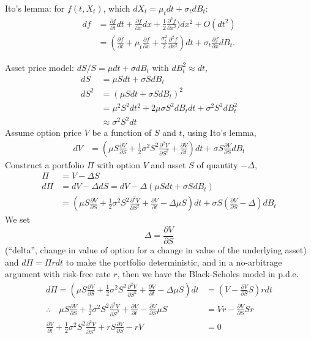 \documentclass[9pt,twocolumn]{extarticle}
\begin{document}
Ito's lemma: for $f(t,X_t)$, which $dX_t = \mu_t dt + \sigma_t dB_t$:
\begin{align*}
df &= \frac{\partial f}{\partial t} dt + \frac{\partial f}{\partial x} dx + \frac{1}{2} \frac{\partial^2 f}{\partial x^2}) dx^2 + O(dt^2) \\
&= \left(\frac{\partial f}{\partial t} + \mu_t \frac{\partial f}{\partial x}+\frac{\sigma_t^2}{2}\frac{\partial^2 f}{\partial x^2}\right) dt + \sigma_t \frac{\partial f}{\partial x}dB_t.
\end{align*}

Asset price model: $dS/S = \mu dt + \sigma dB_t$ with $dB_t^2 \approx dt$,
\begin{align*}
dS &= \mu S dt + \sigma S dB_t \\
dS^2 &= (\mu S dt + \sigma S dB_t)^2 \\
     &= \mu^2 S^2 dt^2 + 2\mu \sigma S^2 dB_t dt + \sigma^2 S^2 dB_t^2 \\
	 &\approx \sigma^2 S^2 dt
\end{align*}
Assume option price $V$ be a function of $S$ and $t$, using Ito's lemma,
\begin{align*}
dV
&= \left(\mu S \frac{\partial V}{\partial S} + \frac{1}{2}\sigma^2 S^2 \frac{\partial^2 V}{\partial S^2} + \frac{\partial V}{\partial t}\right) dt + \sigma S \frac{\partial V}{\partial S} dB_t
\end{align*}
Construct a portfolio $\Pi$ with option $V$ and asset $S$ of quantity $-\Delta$,
\begin{align*}
\Pi &= V - \Delta S \\
d\Pi &= dV - \Delta dS = dV - \Delta(\mu S dt + \sigma S dB_t)\\
&= \left(\mu S \frac{\partial V}{\partial S} + \frac{1}{2}\sigma^2 S^2 \frac{\partial^2 V}{\partial S^2} + \frac{\partial V}{\partial t} - \Delta\mu S\right) dt + \sigma S \left(\frac{\partial V}{\partial S} - \Delta\right) dB_t
\end{align*}
We set $$\Delta = \frac{\partial V}{\partial S}$$ (``delta'', change in value
of option for a change in value of the underlying asset) and $d\Pi = \Pi r dt$
to make the portfolio deterministic, and in a no-arbitrage argument with
risk-free rate $r$, then we have the Black-Scholes model in p.d.e.
\begin{align*}
d\Pi
= \left(\mu S \frac{\partial V}{\partial S} + \frac{1}{2}\sigma^2 S^2 \frac{\partial^2 V}{\partial S^2} + \frac{\partial V}{\partial t} - \Delta\mu S\right) dt
&= \left(V - \frac{\partial V}{\partial S} S\right)rdt \\
\therefore\quad 
\mu S \frac{\partial V}{\partial S} + \frac{1}{2}\sigma^2 S^2 \frac{\partial^2 V}{\partial S^2} + \frac{\partial V}{\partial t} - \frac{\partial V}{\partial S}\mu S
&= Vr - \frac{\partial V}{\partial S} Sr \\
\frac{\partial V}{\partial t} + \frac{1}{2}\sigma^2 S^2 \frac{\partial^2 V}{\partial S^2} + rS \frac{\partial V}{\partial S} - rV &= 0
\end{align*}
\end{document}
